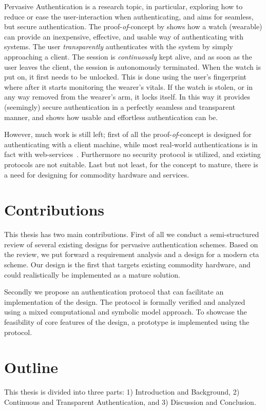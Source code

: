 Pervasive Authentication is a research topic, in particular, exploring how to reduce or ease the user-interaction when authenticating, and aims for seamless, but secure authentication. The proof-\textit{of}-concept by \citet{ojala2008wearable} shows how a watch (wearable) can provide an inexpensive, effective, and usable way of authenticating with systems. The user \textit{transparently} authenticates with the system by simply approaching a client. The session is \textit{continuously} kept alive, and as soon as the user leaves the client, the session is autonomously terminated.
When the watch is put on, it first needs to be unlocked. This is done using the user's fingerprint where after it starts monitoring the wearer's vitals. If the watch is stolen, or in any way removed from the wearer's arm, it locks itself. In this way it provides (seemingly) secure authentication in a perfectly seamless and transparent manner, and shows how usable and effortless authentication can be.

However, much work is still left; first of all the proof-\textit{of}-concept is designed for authenticating with a client machine, while most real-world authentications is in fact with web-services~\cite{hayashi2011diary}. Furthermore no security protocol is utilized, and existing protocols are not suitable. Last but not least, for the concept to mature, there is a need for designing for commodity hardware and services.

\section{Contributions}
This thesis has two main contributions. First of all we conduct a semi-structured review of several existing designs for pervasive authentication schemes. Based on the review, we put forward a requirement analysis and a design for a modern \gls{cta} scheme. Our design is the first that targets existing commodity hardware, and could realistically be implemented as a mature solution.

Secondly we propose an authentication protocol that can facilitate an implementation of the design. The protocol is formally verified and analyzed using a mixed computational and symbolic model approach. To showcase the feasibility of core features of the design, a prototype is implemented using the protocol.


\section{Outline}
This thesis is divided into three parts: 1) Introduction and Background, 2) Continuous and Transparent Authentication, and 3) Discussion and Conclusion.

